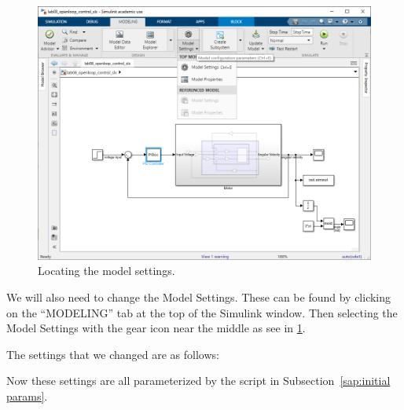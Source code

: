 \documentclass[12pt]{article}
\newcommand\matlab{matlab}
\begin{document}
\begin{figure}
    \centering
    \includegraphics[width=\linewidth]{img/task00_020_finding_model_settings.png}
    \caption{Locating the model settings.}
    \label{fig:task00_020_finding_model_settings}
\end{figure}





We will also need to change the Model Settings. These can be found by clicking on the ``MODELING'' tab at the top of the Simulink window. Then selecting the Model Settings with the gear icon near the middle as see in \ref{fig:task00_020_finding_model_settings}.

The settings that we changed are as follows:

Now these settings are all parameterized by the script in  Subsection~\ref{sap:initial params}.
\end{document}
